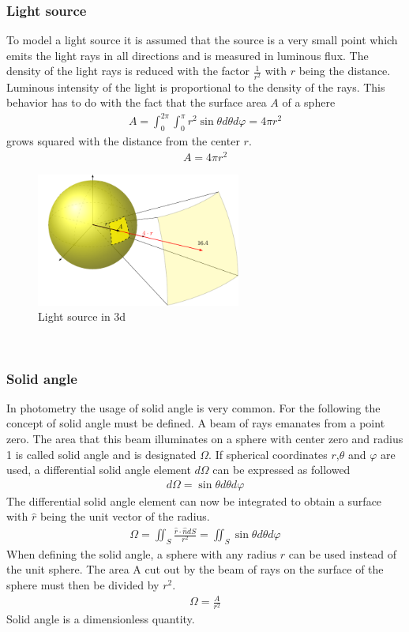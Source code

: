 \subsubsection{Light source}
To model a light source it is assumed that the source is a very small point which emits the light rays in all directions and is measured in luminous flux. The density of the light rays is reduced with the factor $\frac{1}{r^2}$ with $r$ being the distance. Luminous intensity of the light is proportional to the density of the rays. This behavior has to do with the fact that the surface area $A$ of a sphere
\begin{align*}
A=\int_{0}^{2 \pi} \int_{0}^{\pi} r^{2} \sin \theta d \theta d \varphi=4 \pi r^{2}
\end{align*}
grows squared with the distance from the center $r$.
\begin{align*}
A = 4\pi r^2
\end{align*}
\begin{figure}[ht]
	\centering
	\includegraphics[width=0.6\textwidth]{2-theory/backlight/light.pdf}
	\caption{Light source in 3d\label{theory:light}}
\end{figure} 
\\
\subsubsection{Solid angle}
In photometry the usage of solid angle is very common. For the following the concept of solid angle must be defined. A beam of rays emanates from a point zero. The area that this beam illuminates on a sphere with center zero and radius 1 is called solid angle and is designated $\Omega$.
If spherical coordinates $r$,$\theta$ and $\varphi$ are used, a differential solid angle element $d \Omega$ can be expressed as followed
\begin{align*}
d \Omega=\sin \theta d \theta d \varphi
\end{align*}
The differential solid angle element can now be integrated to obtain a surface with $\hat{r}$ being the unit vector of the radius.
\begin{align*}
\Omega=\iint_{S} \frac{\hat{r} \cdot \hat{n} d S}{r^{2}}=\iint_{S} \sin \theta d \theta d \varphi
\end{align*}
When defining the solid angle, a sphere with any radius $r$ can be used instead of the unit sphere. The area A cut out by the beam of rays on the surface of the sphere must then be divided by $r^2$.
\begin{align*}
\Omega=\frac{A}{r^{2}}
\end{align*}
Solid angle is a dimensionless quantity.  

